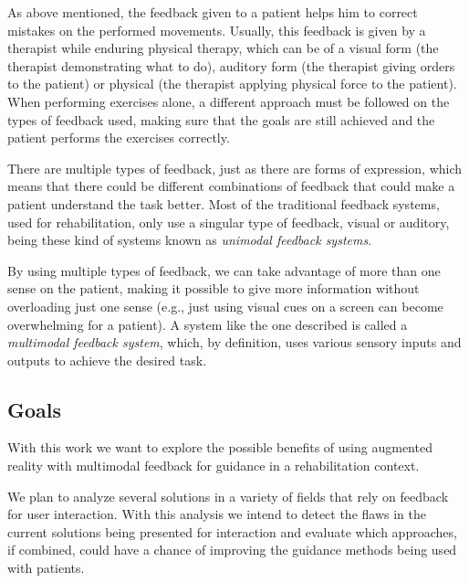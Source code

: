 \documentclass[runningheads]{llncs}
\begin{document}
As above mentioned, the feedback given to a patient helps him to correct mistakes on the performed movements.
Usually, this feedback is given by a therapist while enduring physical therapy, which can be of a visual form (the therapist demonstrating what to do), auditory form (the therapist giving orders to the patient) or physical (the therapist applying physical force to the patient). 
When performing exercises alone, a different approach must be followed on the types of feedback used, making sure that the goals 
are still achieved and the patient performs the exercises correctly.

There are multiple types of feedback, just as there are forms of expression, which means that 
there could be different combinations of feedback that could make a patient understand the task better.
Most of the traditional feedback systems, used for rehabilitation, only use a singular type of feedback,
visual or auditory\cite{Design2005}, being these kind of systems known as \emph{unimodal feedback systems}.

By using multiple types of feedback, we can take advantage of more than one sense on the patient, 
making it possible to give more information without overloading just one sense (e.g., just using visual
cues on a screen can become overwhelming for a patient). A system like the one described is called a 
\emph{multimodal feedback system}, which, by definition, uses various sensory inputs and outputs to achieve the desired task.



\subsection{Goals}

With this work we want to explore the possible benefits of using augmented reality with multimodal 
feedback for guidance in a rehabilitation context.

We plan to analyze several solutions in a variety of fields that rely on feedback for user interaction.
With this analysis we intend to detect the flaws in the current solutions being presented for interaction 
and evaluate which approaches, if combined, could have a chance of improving 
the guidance methods being used with patients.

\end{document}
